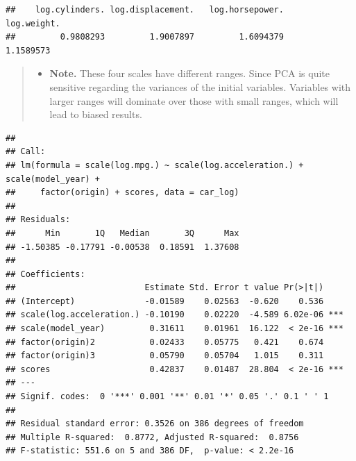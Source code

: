 \documentclass[
]{article}
\newenvironment{Shaded}{\begin{snugshade}}{\end{snugshade}}
\newcommand{\AttributeTok}[1]{\textcolor[rgb]{0.77,0.63,0.00}{#1}}
\newcommand{\ConstantTok}[1]{\textcolor[rgb]{0.00,0.00,0.00}{#1}}
\newcommand{\FunctionTok}[1]{\textcolor[rgb]{0.00,0.00,0.00}{#1}}
\newcommand{\NormalTok}[1]{#1}
\newcommand{\OtherTok}[1]{\textcolor[rgb]{0.56,0.35,0.01}{#1}}
\newcommand{\SpecialCharTok}[1]{\textcolor[rgb]{0.00,0.00,0.00}{#1}}
\newcommand{\StringTok}[1]{\textcolor[rgb]{0.31,0.60,0.02}{#1}}
\providecommand{\tightlist}{%
  \setlength{\itemsep}{0pt}\setlength{\parskip}{0pt}}
\begin{document}
\begin{verbatim}
##    log.cylinders. log.displacement.   log.horsepower.       log.weight. 
##         0.9808293         1.9007897         1.6094379         1.1589573
\end{verbatim}

\begin{quote}
\begin{itemize}
\tightlist
\item
  \textbf{Note.} These four scales have different ranges. Since PCA is
  quite sensitive regarding the variances of the initial variables.
  Variables with larger ranges will dominate over those with small
  ranges, which will lead to biased results.
\end{itemize}
\end{quote}

\begin{Shaded}
\end{Shaded}

\begin{verbatim}
## 
## Call:
## lm(formula = scale(log.mpg.) ~ scale(log.acceleration.) + scale(model_year) + 
##     factor(origin) + scores, data = car_log)
## 
## Residuals:
##      Min       1Q   Median       3Q      Max 
## -1.50385 -0.17791 -0.00538  0.18591  1.37608 
## 
## Coefficients:
##                          Estimate Std. Error t value Pr(>|t|)    
## (Intercept)              -0.01589    0.02563  -0.620    0.536    
## scale(log.acceleration.) -0.10190    0.02220  -4.589 6.02e-06 ***
## scale(model_year)         0.31611    0.01961  16.122  < 2e-16 ***
## factor(origin)2           0.02433    0.05775   0.421    0.674    
## factor(origin)3           0.05790    0.05704   1.015    0.311    
## scores                    0.42837    0.01487  28.804  < 2e-16 ***
## ---
## Signif. codes:  0 '***' 0.001 '**' 0.01 '*' 0.05 '.' 0.1 ' ' 1
## 
## Residual standard error: 0.3526 on 386 degrees of freedom
## Multiple R-squared:  0.8772, Adjusted R-squared:  0.8756 
## F-statistic: 551.6 on 5 and 386 DF,  p-value: < 2.2e-16
\end{verbatim}
\end{document}
